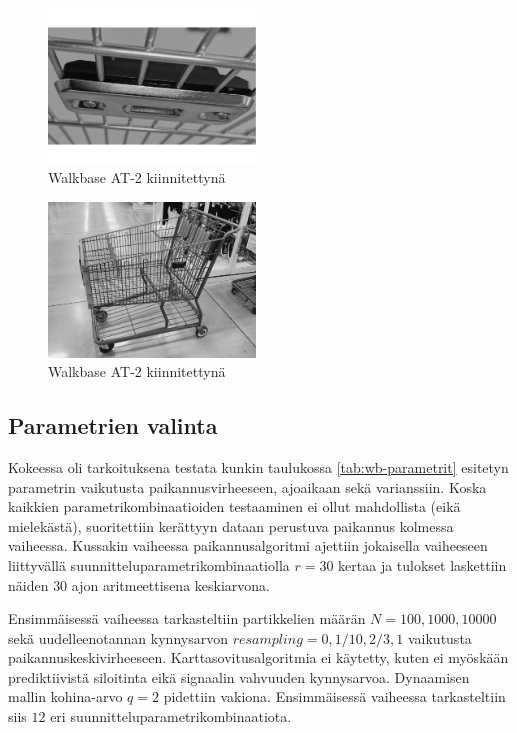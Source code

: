 \documentclass[
  12pt,
  a4paper, twoside]{book}
\begin{document}
\newpage

\begin{multicols}{2}
\begin{figure}[H]
\centering
\includegraphics[width=5.5cm]{at_2_cart}
\caption{Walkbase AT-2 kiinnitettynä}
\label{fig:at2_cart}
\end{figure}

\begin{figure}[H]
\centering
\includegraphics[width=5.5cm]{at_2_cart2}
\caption{Walkbase AT-2 kiinnitettynä}
\label{fig:at2_cart2}
\end{figure}
\end{multicols}

\subsection{Parametrien valinta} \label{parametrien-valinta}

Kokeessa oli tarkoituksena testata kunkin taulukossa \ref{tab:wb-parametrit} esitetyn parametrin vaikutusta paikannusvirheeseen, ajoaikaan sekä varianssiin. Koska kaikkien parametrikombinaatioiden testaaminen ei ollut mahdollista (eikä mielekästä), suoritettiin kerättyyn dataan perustuva paikannus kolmessa vaiheessa. Kussakin vaiheessa paikannusalgoritmi ajettiin jokaisella vaiheeseen liittyvällä suunnitteluparametrikombinaatiolla \(r=30\) kertaa ja tulokset laskettiin näiden \(30\) ajon aritmeettisena keskiarvona.

Ensimmäisessä vaiheessa tarkasteltiin partikkelien määrän \(N={100,1000,10000}\) sekä uudelleenotannan kynnysarvon \(resampling={0,1/10,2/3,1}\) vaikutusta paikannuskeskivirheeseen. Karttasovitusalgoritmia ei käytetty, kuten ei myöskään prediktiivistä siloitinta eikä signaalin vahvuuden kynnysarvoa. Dynaamisen mallin kohina-arvo \(q=2\) pidettiin vakiona. Ensimmäisessä vaiheessa tarkasteltiin siis \(12\) eri suunnitteluparametrikombinaatiota.
\end{document}
